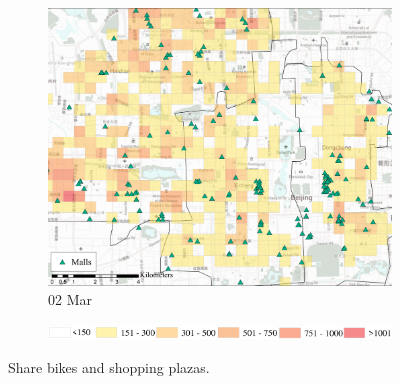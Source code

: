 \documentclass[preprints,article,accept,moreauthors,pdftex]{Definitions/mdpi}
\begin{document}
\begin{figure}[H]
\begin{subfigure}{.32\textwidth}
        \includegraphics[width=\textwidth]{Figures/Relation_with_POIs/POIsMallD2020_03_02.pdf}
        \caption{02 Mar}
    \end{subfigure}

    \vspace{6pt}
    \begin{subfigure}{.7\textwidth}
        \includegraphics[width=\textwidth]{Figures/AppendixLegend2.eps}
    \end{subfigure}
    \caption{Share bikes and shopping plazas.}
    \label{fig:BSS_malls}
\end{figure}
\end{document}
